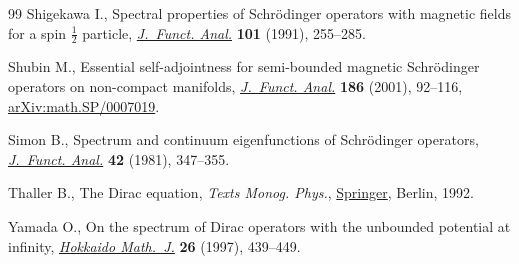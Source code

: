 \begin{thebibliography}{99}
Shigekawa I., Spectral properties of {S}chr\"odinger operators with magnetic
 fields for a spin {$\frac12$} particle, \href{https://doi.org/10.1016/0022-1236(91)90158-2}{\textit{J.~Funct. Anal.}} \textbf{101}
 (1991), 255--285.

Shubin M., Essential self-adjointness for semi-bounded magnetic {S}chr\"odinger
 operators on non-compact manifolds, \href{https://doi.org/10.1006/jfan.2001.3778}{\textit{J.~Funct. Anal.}} \textbf{186}
 (2001), 92--116, \href{https://arxiv.org/abs/math.SP/0007019}{arXiv:math.SP/0007019}.

Simon B., Spectrum and continuum eigenfunctions of {S}chr\"odinger operators,
 \href{https://doi.org/10.1016/0022-1236(81)90094-X}{\textit{J.~Funct. Anal.}} \textbf{42} (1981), 347--355.

Thaller B., The {D}irac equation, \textit{Texts Monog. Phys.}, \href{https://doi.org/10.1007/978-3-662-02753-0}{Springer}, Berlin, 1992.

Yamada O., On the spectrum of {D}irac operators with the unbounded potential at
 infinity, \href{https://doi.org/10.14492/hokmj/1351257976}{\textit{Hokkaido Math.~J.}} \textbf{26} (1997), 439--449.

\end{thebibliography}
